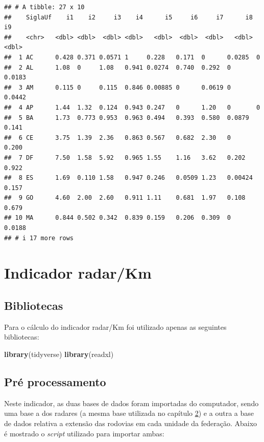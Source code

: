 \documentclass[
]{book}
\newenvironment{Shaded}{\begin{snugshade}}{\end{snugshade}}
\newcommand{\FunctionTok}[1]{\textcolor[rgb]{0.13,0.29,0.53}{\textbf{#1}}}
\newcommand{\NormalTok}[1]{#1}
\begin{document}
\begin{verbatim}
## # A tibble: 27 x 10
##    SiglaUf    i1    i2     i3    i4      i5     i6     i7      i8     i9
##    <chr>   <dbl> <dbl>  <dbl> <dbl>   <dbl>  <dbl>  <dbl>   <dbl>  <dbl>
##  1 AC      0.428 0.371 0.0571 1     0.228   0.171  0      0.0285  0     
##  2 AL      1.08  0     1.08   0.941 0.0274  0.740  0.292  0       0.0183
##  3 AM      0.115 0     0.115  0.846 0.00885 0      0.0619 0       0.0442
##  4 AP      1.44  1.32  0.124  0.943 0.247   0      1.20   0       0     
##  5 BA      1.73  0.773 0.953  0.963 0.494   0.393  0.580  0.0879  0.141 
##  6 CE      3.75  1.39  2.36   0.863 0.567   0.682  2.30   0       0.200 
##  7 DF      7.50  1.58  5.92   0.965 1.55    1.16   3.62   0.202   0.922 
##  8 ES      1.69  0.110 1.58   0.947 0.246   0.0509 1.23   0.00424 0.157 
##  9 GO      4.60  2.00  2.60   0.911 1.11    0.681  1.97   0.108   0.679 
## 10 MA      0.844 0.502 0.342  0.839 0.159   0.206  0.309  0       0.0188
## # i 17 more rows
\end{verbatim}

\chapter{Indicador radar/Km}\label{indicador-radarkm}

\section{Bibliotecas}\label{bibliotecas-1}

Para o cálculo do indicador radar/Km foi utilizado apenas as seguintes bibliotecas:

\begin{Shaded}
\begin{Highlighting}[]
\FunctionTok{library}\NormalTok{(tidyverse)}
\FunctionTok{library}\NormalTok{(readxl)}
\end{Highlighting}
\end{Shaded}

\section{Pré processamento}\label{pruxe9-processamento-1}

Neste indicador, as duas bases de dados foram importadas do computador, sendo uma base a dos radares (a mesma base utilizada no capítulo \hyperref[radar-frota]{2}) e a outra a base de dados relativa a extensão das rodovias em cada unidade da federação. Abaixo é mostrado o \emph{script} utilizado para importar ambas:
\end{document}

